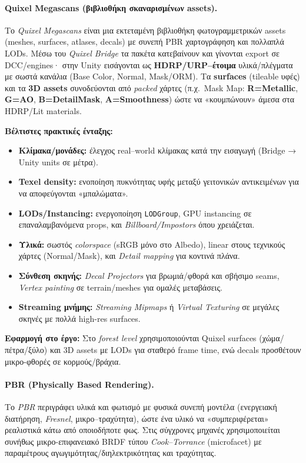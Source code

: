 \paragraph{Quixel Megascans (βιβλιοθήκη σκαναρισμένων assets).}
Το \textit{Quixel Megascans} είναι μια εκτεταμένη βιβλιοθήκη φωτογραμμετρικών assets (meshes, surfaces, atlases, decals) με συνεπή PBR χαρτογράφηση και πολλαπλά LODs. Μέσω του \textit{Quixel Bridge} τα πακέτα κατεβαίνουν και γίνονται export σε DCC/engines· στην Unity εισάγονται ως \textbf{HDRP/URP–έτοιμα} υλικά/πλέγματα με σωστά κανάλια (Base Color, Normal, Mask/ORM). Τα \textbf{surfaces} (tileable υφές) και τα \textbf{3D assets} συνοδεύονται από \emph{packed} χάρτες (π.χ.\ Mask Map: \textbf{R=Metallic}, \textbf{G=AO}, \textbf{B=DetailMask}, \textbf{A=Smoothness}) ώστε να «κουμπώνουν» άμεσα στα HDRP/Lit materials.

\textbf{Βέλτιστες πρακτικές ένταξης:}
\begin{itemize}
  \item \textbf{Κλίμακα/μονάδες:} έλεγχος real–world κλίμακας κατά την εισαγωγή (Bridge → Unity units σε μέτρα).
  \item \textbf{Texel density:} ενοποίηση πυκνότητας υφής μεταξύ γειτονικών αντικειμένων για να αποφεύγονται «μπαλώματα».
  \item \textbf{LODs/Instancing:} ενεργοποίηση \texttt{LODGroup}, GPU instancing σε επαναλαμβανόμενα props, και \emph{Billboard/Impostors} όπου χρειάζεται.
  \item \textbf{Υλικά:} σωστός \emph{colorspace} (sRGB μόνο στο Albedo), linear στους τεχνικούς χάρτες (Normal/Mask), και \textit{Detail mapping} για κοντινά πλάνα.
  \item \textbf{Σύνθεση σκηνής:} \textit{Decal Projectors} για βρωμιά/φθορά και σβήσιμο seams, \textit{Vertex painting} σε terrain/meshes για ομαλές μεταβάσεις.
  \item \textbf{Streaming μνήμης:} \textit{Streaming Mipmaps} ή \textit{Virtual Texturing} σε μεγάλες σκηνές με πολλά high-res surfaces.
\end{itemize}

\textbf{Εφαρμογή στο έργο:}
Στο \emph{forest level} χρησιμοποιούνται Quixel surfaces (χώμα/πέτρα/ξύλο) και 3D assets με LODs για σταθερό frame time, ενώ decals προσθέτουν μικρο-φθορές σε κορμούς/βράχια.

\paragraph{PBR (Physically Based Rendering).}
Το \textit{PBR} περιγράφει υλικά και φωτισμό με φυσικά συνεπή μοντέλα (ενεργειακή διατήρηση, \textit{Fresnel}, μικρο–τραχύτητα), ώστε ένα υλικό να «συμπεριφέρεται» ρεαλιστικά κάτω από οποιοδήποτε φως. Στις σύγχρονες μηχανές χρησιμοποιείται συνήθως μικρο-επιφανειακό BRDF τύπου \textit{Cook–Torrance} (microfacet) με παραμέτρους αγωγιμότητας/διηλεκτρικότητας και τραχύτητας.

